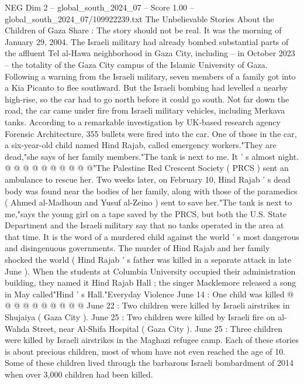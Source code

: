 \begin{textsample}{NEG Dim 2 – global\_south\_2024\_07 – Score 1.00 – global\_south\_2024\_07/109922239.txt}  \label{ex:f2_neg_379}
The Unbelievable Stories About the Children of Gaza Share : The story should not be real.
It was the morning of January 29, 2004.
The Israeli military had already bombed substantial parts of the affluent Tel al-Hawa neighborhood in Gaza City, including -- in October 2023 -- the totality of the Gaza City campus of the Islamic University of Gaza.
Following a warning from the Israeli military, seven members of a family got into a Kia Picanto to flee southward.
But the Israeli bombing had levelled a nearby high-rise, so the car had to go north before it could go south.
Not far down the road, the car came under fire from Israeli military vehicles, including Merkava tanks.
According to a remarkable investigation by UK-based research agency Forensic Architecture, 355 bullets were fired into the car.
One of those in the car, a six-year-old child named Hind Rajab, called emergency workers."They are dead,"she says of her family members."The tank is next to me.
It ' s almost night. @ @ @ @ @ @ @ @ @ @"The Palestine Red Crescent Society ( PRCS ) sent an ambulance to rescue her.
Two weeks later, on February 10, Hind Rajab ' s dead body was found near the bodies of her family, along with those of the paramedics ( Ahmed al-Madhoun and Yusuf al-Zeino ) sent to save her."The tank is next to me,"says the young girl on a tape saved by the PRCS, but both the U.S.
State Department and the Israeli military say that no tanks operated in the area at that time.
It is the word of a murdered child against the world ' s most dangerous and disingenuous governments.
The murder of Hind Rajab and her family shocked the world ( Hind Rajab ' s father was killed in a separate attack in late June ).
When the students at Columbia University occupied their administration building, they named it Hind Rajab Hall ; the singer Macklemore released a song in May called"Hind ' s Hall."Everyday Violence June 14 : One child was killed @ @ @ @ @ @ @ @ @ @ June 22 : Two children were killed by Israeli airstrikes in Shujaiya ( Gaza City ).
June 25 : Two children were killed by Israeli fire on al-Wahda Street, near Al-Shifa Hospital ( Gaza City ).
June 25 : Three children were killed by Israeli airstrikes in the Maghazi refugee camp.
Each of these stories is about precious children, most of whom have not even reached the age of 10.
Some of these children lived through the barbarous Israeli bombardment of 2014 when over 3,000 children had been killed.

\end{textsample}
